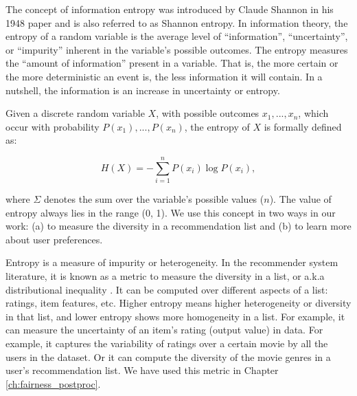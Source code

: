             The concept of information entropy was introduced by Claude Shannon in his 1948 paper \cite{entropy1948} and is also referred to as Shannon entropy. In information theory, the entropy of a random variable is the average level of ``information'', ``uncertainty'', or ``impurity'' inherent in the variable's possible outcomes. The entropy measures the “amount of information” present in a variable. That is, the more certain or the more deterministic an event is, the less information it will contain. In a nutshell, the information is an increase in uncertainty or entropy. 
        
            Given a discrete random variable $X$, with possible outcomes $x_{1},...,x_{n}$, which occur with probability $P(x_1),...,P(x_n)$, the entropy of $X$ is formally defined as:
         
             \begin{equation}
                H(X)=-\sum_{i=1}^{n}P(x_{i})\log P(x_{i}),
             \end{equation}
             \vspace{0.25cm}

            where $\Sigma$ denotes the sum over the variable's possible values ($n$). The value of entropy always lies in the range (0, 1). We use this concept in two ways in our work: (a) to measure the diversity in a recommendation list and (b) to learn more about user preferences. 
            
            Entropy is a measure of impurity or heterogeneity. In the recommender system literature, it is known as a metric to measure the diversity in a list, or a.k.a distributional inequality \cite{RICOTTA2006237, DINOIA2017234, Eskandanian2017}. It can be computed over different aspects of a list: ratings, item features, etc. Higher entropy means higher heterogeneity or diversity in that list, and lower entropy shows more homogeneity in a list. For example, it can measure the uncertainty of an item’s rating (output value) in data. For example, it captures the variability of ratings over a certain movie by all the users in the dataset. Or it can compute the diversity of the movie genres in a user's recommendation list. We have used this metric in Chapter \ref{ch:fairness_postproc}.
        
